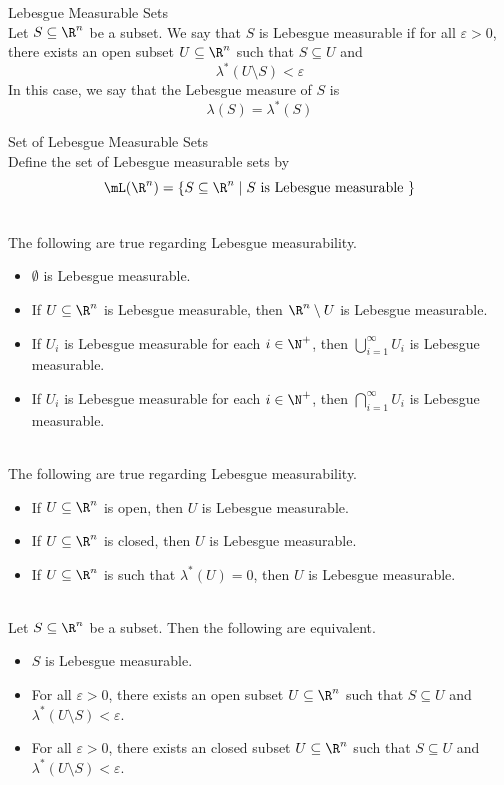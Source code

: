 \documentclass[a4paper]{article}
\begin{document}
\begin{defn}{Lebesgue Measurable Sets}{}\\
Let $S\subseteq\R^n$ be a subset. We say that $S$ is Lebesgue measurable if for all $\varepsilon>0$, there exists an open subset $U\subseteq\R^n$ such that $S\subseteq U$ and $$\lambda^\ast(U\setminus S)<\varepsilon$$ In this case, we say that the Lebesgue measure of $S$ is $$\lambda(S)=\lambda^\ast(S)$$
\end{defn}

\begin{defn}{Set of Lebesgue Measurable Sets}{}\\
Define the set of Lebesgue measurable sets by $$\mL(\R^n)=\{S\subseteq\R^n\;|\;S\text{ is Lebesgue measurable }\}$$
\end{defn}

\begin{prp}{}{}\\
The following are true regarding Lebesgue measurability. 
\begin{itemize}
\item $\emptyset$ is Lebesgue measurable. 
\item If $U\subseteq\R^n$ is Lebesgue measurable, then $\R^n\setminus U$ is Lebesgue measurable. 
\item If $U_i$ is Lebesgue measurable for each $i\in\N^+$, then $\bigcup_{i=1}^\infty U_i$ is Lebesgue measurable. 
\item If $U_i$ is Lebesgue measurable for each $i\in\N^+$, then $\bigcap_{i=1}^\infty U_i$ is Lebesgue measurable. 
\end{itemize}
\end{prp}

\begin{prp}{}{}\\
The following are true regarding Lebesgue measurability. 
\begin{itemize}
\item If $U\subseteq\R^n$ is open, then $U$ is Lebesgue measurable. 
\item If $U\subseteq\R^n$ is closed, then $U$ is Lebesgue measurable. 
\item If $U\subseteq\R^n$ is such that $\lambda^\ast(U)=0$, then $U$ is Lebesgue measurable. 
\end{itemize}
\end{prp}

\begin{prp}{}{}\\
Let $S\subseteq\R^n$ be a subset. Then the following are equivalent. 
\begin{itemize}
\item $S$ is Lebesgue measurable. 
\item For all $\varepsilon>0$, there exists an open subset $U\subseteq\R^n$ such that $S\subseteq U$ and $\lambda^\ast(U\setminus S)<\varepsilon$. 
\item For all $\varepsilon>0$, there exists an closed subset $U\subseteq\R^n$ such that $S\subseteq U$ and $\lambda^\ast(U\setminus S)<\varepsilon$. 
\end{itemize}
\end{prp}
\end{document}
